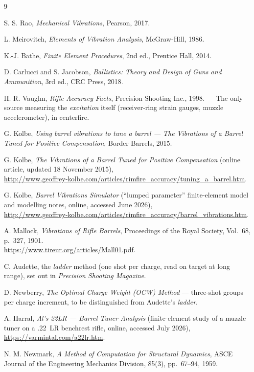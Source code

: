 \documentclass[12pt,a4paper]{article}
\begin{document}
	\begin{thebibliography}{9}

		S. S. Rao, \textit{Mechanical Vibrations}, Pearson, 2017.

		L. Meirovitch, \textit{Elements of Vibration Analysis}, McGraw-Hill, 1986.

		K.-J. Bathe, \textit{Finite Element Procedures}, 2nd ed., Prentice Hall, 2014.

		D. Carlucci and S. Jacobson, \textit{Ballistics: Theory and Design of Guns and Ammunition}, 3rd ed., CRC Press, 2018.

		H. R. Vaughn, \textit{Rifle Accuracy Facts}, Precision Shooting Inc., 1998. --- The only source measuring the \emph{excitation} itself (receiver-ring strain gauges, muzzle accelerometer), in centerfire.

		G. Kolbe, \textit{Using barrel vibrations to tune a barrel --- The Vibrations of a Barrel Tuned for Positive Compensation}, Border Barrels, 2015.

		G. Kolbe, \textit{The Vibrations of a Barrel Tuned for Positive Compensation} (online article, updated 18 November 2015),\\
		\url{http://www.geoffrey-kolbe.com/articles/rimfire_accuracy/tuning_a_barrel.htm}.

		G. Kolbe, \textit{Barrel Vibrations Simulator} (``lumped parameter'' finite-element model and modelling notes, online, accessed June 2026),\\
		\url{http://www.geoffrey-kolbe.com/articles/rimfire_accuracy/barrel_vibrations.htm}.

		A. Mallock, \textit{Vibrations of Rifle Barrels}, Proceedings of the Royal Society, Vol.~68, p.~327, 1901.\\
		\url{https://www.tireur.org/articles/Mall01.pdf}.

		C. Audette, the \emph{ladder} method (one shot per charge, read on target at long range),
		set out in \textit{Precision Shooting Magazine}.

		D. Newberry, \textit{The Optimal Charge Weight (OCW) Method} --- three-shot groups per charge
		increment, to be distinguished from Audette's \emph{ladder}.

		A. Harral, \textit{Al's 22LR --- Barrel Tuner Analysis} (finite-element study of a muzzle tuner on a .22~LR benchrest rifle, online, accessed July 2026),\\
		\url{https://varmintal.com/a22lr.htm}.

		N. M. Newmark, \textit{A Method of Computation for Structural Dynamics}, ASCE Journal of the Engineering Mechanics Division, 85(3), pp.\ 67--94, 1959.

	\end{thebibliography}
\end{document}
